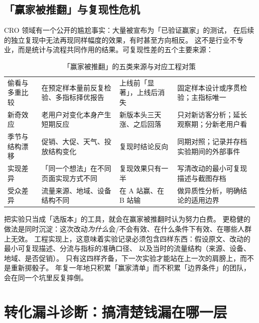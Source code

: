 \subsection{「赢家被推翻」与复现性危机}

CRO 领域有一个公开的尴尬事实：大量被宣布为「已验证赢家」的测试，
在后续的独立复现中无法再现同样幅度的效果，有时甚至方向相反。
这不是行业不专业，而是统计与流程共同作用的结果。可复现性差的五个主要来源：

\begin{table}[htbp]
\centering
\caption{「赢家被推翻」的五类来源与对应工程对策}
\label{tab:replication}
\small
\begin{tabularx}{\textwidth}{L{2.3cm} L{4.0cm} L{3.4cm} Y}
\toprule
{} &  &  &  \\
\midrule
偷看与多重比较 & 在预定样本量前反复检验、多指标择优报告 & 上线前「显著」，上线后消失 & 固定样本设计或序贯检验；主指标唯一 \\
新奇效应 & 老用户对变化本身产生短期反应 & 新版本头三天涨、之后回落 & 只对新访客分析；延长观察期；分新老用户看 \\
季节与结构漂移 & 促销、大促、天气、投放结构变化 & 复现时结论反向 & 同期对照；记录并存档实验期间的外部事件 \\
实现差异 & 「同一个想法」在不同页面实现方式不同 & 复现效果只有一半 & 写清改动的最小可复现描述与截图存档 \\
受众差异 & 流量来源、地域、设备结构不同 & 在 A 站赢、在 B 站输 & 做异质性分析，明确结论的适用边界 \\
\bottomrule
\end{tabularx}
\end{table}

\begin{insight}
把实验只当成「选版本」的工具，就会在赢家被推翻时认为努力白费。
更稳健的做法是同时沉淀：这次改动\emph{为什么}会/不会有效、在什么条件下有效、在哪些人群上无效。
工程实现上，这意味着实验记录必须包含四样东西：假设原文、改动的最小可复现描述、分流与指标的准确口径、
以及当时的流量结构（来源、设备、地域、是否促销）。
只有这四样齐备，下一次实验才能站在上一次的肩膀上，而不是重新掷骰子。
年复一年地只积累「赢家清单」而不积累「边界条件」的团队，会在同一个坑里反复摔倒。
\end{insight}

\section{转化漏斗诊断：搞清楚钱漏在哪一层}
\label{sec:cro-funnel}

